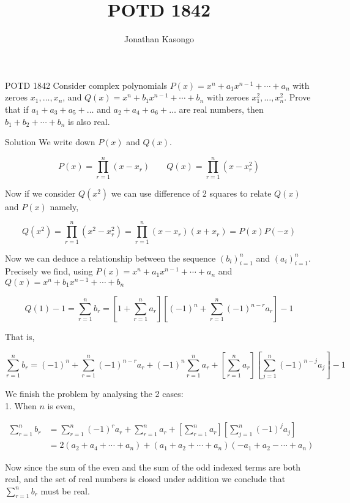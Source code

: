 \documentclass{article}
\author{Jonathan Kasongo}
\title{POTD 1842}
\begin{document}
\maketitle

\begin{problem}{POTD 1842}
Consider complex polynomials $P(x)=x^n+a_1 x^{n-1}+\cdots+a_n$ with zeroes
$x_1, \ldots, x_n$, and $Q(x)=x^n+b_1 x^{n-1}+\cdots+b_n$ with zeroes
$x_1^2, \ldots, x_n^2$. Prove that if $a_1+a_3+a_5+\ldots$ and
$a_2+a_4+a_6+\ldots$ are real numbers, then $b_1+b_2+\cdots+b_n$ is also
real.
\end{problem}

\begin{solution}{Solution}
We write down $P(x)$ and $Q(x)$.

$$
P(x) = \prod_{r=1}^n (x-x_r) \; \; \; \; \; \; \;
Q(x) = \prod_{r=1}^n (x-x_r^2)
$$

Now if we consider $Q(x^2)$ we can use difference of 2 squares to relate
$Q(x)$ and $P(x)$ namely,

$$
Q(x^2) = \prod_{r=1}^n (x^2 - x_r^2) = \prod_{r=1}^n (x-x_r)(x+x_r) = P(x)P(-x)
$$

Now we can deduce a relationship between the sequence $(b_i)_{i=1}^n$ and
$(a_i)_{i=1}^n$. Precisely we find, using
$P(x) = x^n+a_1 x^{n-1}+\cdots+a_n$ and
$Q(x)=x^n+b_1 x^{n-1}+\cdots+b_n$

$$
Q(1) - 1 = \sum_{r=1}^n b_r = \left[ 1 + \sum_{r=1}^n a_r \right]
\left[ (-1)^n + \sum_{r=1}^n (-1)^{n-r} a_r \right] -1
$$

That is,

$$
\sum_{r=1}^n b_r = (-1)^n + \sum_{r=1}^n (-1)^{n-r} a_r +
(-1)^n \sum_{r=1}^n a_r + \left[ \sum_{r=1}^n a_r \right]
\left[ \sum_{j=1}^{n} (-1)^{n-j} a_j \right] -1
$$

We finish the problem by analysing the 2 cases: \\

1. When $n$ is even,

\[
\begin{aligned}
\sum_{r=1}^n b_r &= \sum_{r=1}^n (-1)^r a_r + \sum_{r=1}^n a_r +
\left[ \sum_{r=1}^n a_r \right]
\left[ \sum_{j=1}^{n} (-1)^{j} a_j \right]\\
&= 2(a_2 + a_4 + \cdots + a_n) + (a_1 + a_2 + \cdots + a_n)(-a_1 + a_2 - \cdots + a_n)
\end{aligned}
\]

Now since the sum of the even and the sum of the odd indexed terms are
both real, and the set of real numbers is closed under addition we
conclude that $\sum_{r=1}^n b_r$ must be real.\\


\end{solution}
\end{document}
